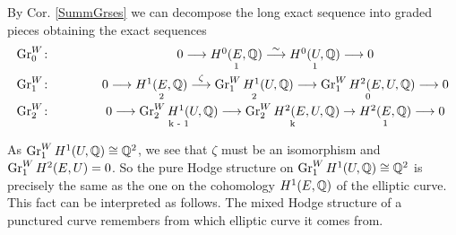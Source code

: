 \documentclass[../main.tex]{subfiles}
\begin{document}
\begin{es}
\vspace{5mm}
\begin{center}
    

\end{center}

\vspace{5mm}

By Cor. \ref{SummGrses} we can decompose the long exact sequence into graded pieces obtaining the exact sequences
\[
\begin{array}{lcc}
\operatorname{Gr}^W_0\colon&\qquad& 0\longrightarrow \underset{\text{1}}{H^0(E,\mathbb{Q})} \stackrel{\sim}{\longrightarrow} \underset{\text{1}}{H^0(U,\mathbb{Q})} \longrightarrow 0 \\[3mm]
\operatorname{Gr}^W_1\colon&& 0 \longrightarrow \underset{\text{2}}{H^1(E,\mathbb{Q})} \stackrel{\zeta}{\longrightarrow} \underset{\text{2}}{\operatorname{Gr}^W_1H^1(U,\mathbb{Q})} \longrightarrow  \underset{\text{0}}{\operatorname{Gr}^W_1H^2(E,U,\mathbb{Q})} \longrightarrow 0 \\[3mm]
\operatorname{Gr}^W_2\colon&& 0\longrightarrow \underset{\text{k - 1}}{\operatorname{Gr}^W_2H^1(U,\mathbb{Q})} \longrightarrow \underset{\text{k}}{\operatorname{Gr}^W_2H^{2}(E,U,\mathbb{Q})} \to \underset{\text{1}}{H^2(E,\mathbb{Q})}  \longrightarrow 0 \\[2mm]
\end{array}
\]

As $\operatorname{Gr}_1^WH^1(U,\mathbb{Q})\cong\mathbb{Q}^2$, we see that $\zeta$ must be an isomorphism and $\operatorname{Gr}^W_1H^2(E,U)=0$. So the pure Hodge structure on $\operatorname{Gr}_1^WH^1(U,\mathbb{Q})\cong\mathbb{Q}^2$ is precisely the same as the one on the cohomology $H^1(E,\mathbb{Q})$ of the elliptic curve. This fact can be interpreted as follows. The mixed Hodge structure of a punctured curve remembers from which elliptic curve it comes from.  


\end{es}
\end{document}
